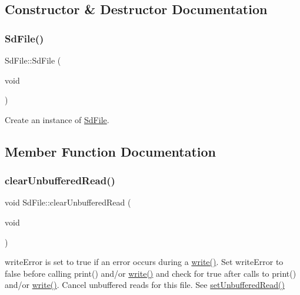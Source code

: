 \subsection{Constructor \& Destructor Documentation}
\mbox{\label{class_sd_file_a9e08675e64a4ef847700876d4291bbef}} 
\subsubsection{\texorpdfstring{Sd\+File()}{SdFile()}}
{\footnotesize\ttfamily Sd\+File\+::\+Sd\+File (\begin{DoxyParamCaption}\item[{void}]{ }\end{DoxyParamCaption})\hspace{0.3cm}{\ttfamily [inline]}}

Create an instance of \hyperlink{class_sd_file}{Sd\+File}. 

\subsection{Member Function Documentation}
\mbox{\label{class_sd_file_a44c3d6ef602e84b8160a4d215faef7d4}} 
\subsubsection{\texorpdfstring{clear\+Unbuffered\+Read()}{clearUnbufferedRead()}}
{\footnotesize\ttfamily void Sd\+File\+::clear\+Unbuffered\+Read (\begin{DoxyParamCaption}\item[{void}]{ }\end{DoxyParamCaption})\hspace{0.3cm}{\ttfamily [inline]}}

write\+Error is set to true if an error occurs during a \hyperlink{class_sd_file_a67267a4b63d03a16e099195935613006}{write()}. Set write\+Error to false before calling print() and/or \hyperlink{class_sd_file_a67267a4b63d03a16e099195935613006}{write()} and check for true after calls to print() and/or \hyperlink{class_sd_file_a67267a4b63d03a16e099195935613006}{write()}. Cancel unbuffered reads for this file. See \hyperlink{class_sd_file_a08c9e76a4a7bb43fccf1dd5c72c66a16}{set\+Unbuffered\+Read()} \mbox{\label{class_sd_file_a6b24350c89cc41ff644a343231a3983c}} 
